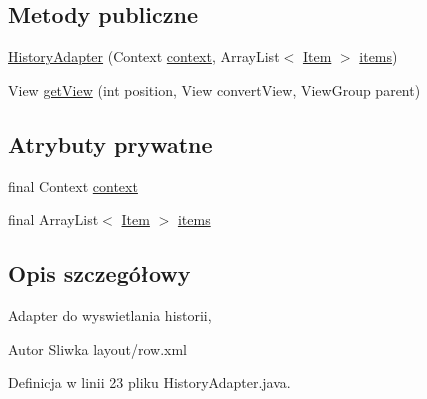 \subsection*{Metody publiczne}
\begin{DoxyCompactItemize}
\item 
\hyperlink{classcom_1_1example_1_1qrpoll_1_1_history_adapter_a823c07f9fa09b58051bc1af5ada028b7}{History\+Adapter} (Context \hyperlink{classcom_1_1example_1_1qrpoll_1_1_history_adapter_a118ff9b19fe9e292e2a60fc5b42150f9}{context}, Array\+List$<$ \hyperlink{classcom_1_1example_1_1qrpoll_1_1_item}{Item} $>$ \hyperlink{classcom_1_1example_1_1qrpoll_1_1_history_adapter_adc0f747e0409d63449e90738b935ce1d}{items})
\item 
View \hyperlink{classcom_1_1example_1_1qrpoll_1_1_history_adapter_a272e253c50d2c55359900516f1eab7e6}{get\+View} (int position, View convert\+View, View\+Group parent)
\end{DoxyCompactItemize}
\subsection*{Atrybuty prywatne}
\begin{DoxyCompactItemize}
\item 
final Context \hyperlink{classcom_1_1example_1_1qrpoll_1_1_history_adapter_a118ff9b19fe9e292e2a60fc5b42150f9}{context}
\item 
final Array\+List$<$ \hyperlink{classcom_1_1example_1_1qrpoll_1_1_item}{Item} $>$ \hyperlink{classcom_1_1example_1_1qrpoll_1_1_history_adapter_adc0f747e0409d63449e90738b935ce1d}{items}
\end{DoxyCompactItemize}


\subsection{Opis szczegółowy}
Adapter do wyswietlania historii, \begin{DoxyAuthor}{Autor}
Sliwka layout/row.\+xml 
\end{DoxyAuthor}


Definicja w linii 23 pliku History\+Adapter.\+java.



